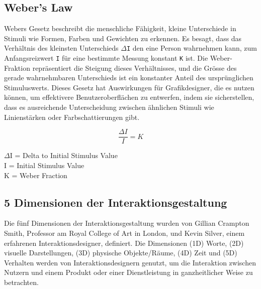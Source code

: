 \documentclass{article}
\begin{document}
\subsection{Weber's Law}
Webers Gesetz beschreibt die menschliche Fähigkeit,
kleine Unterschiede in Stimuli wie Formen, 
Farben und Gewichten zu erkennen. Es besagt, 
dass das Verhältnis des kleinsten Unterschieds \texttt{$\Delta$I}
den eine Person wahrnehmen kann, zum Anfangsreizwert \texttt{I} für eine bestimmte Messung konstant \texttt{K} ist. 
Die Weber-Fraktion repräsentiert die Steigung dieses Verhältnisses,
 und die Grösse des gerade wahrnehmbaren Unterschieds ist ein konstanter 
 Anteil des ursprünglichen Stimuluswerts. Dieses Gesetz hat Auswirkungen für Grafikdesigner,
  die es nutzen können, um effektivere Benutzeroberflächen zu entwerfen, 
  indem sie sicherstellen, dass es ausreichende Unterscheidung zwischen ähnlichen Stimuli
   wie Linienstärken oder Farbschattierungen gibt.\cite{noauthor_virtual_nodate}

\begin{equation}
    \frac{\Delta I}{I} = K
\end{equation}

\begin{center}
    $\Delta$I = Delta to Initial Stimulus Value\\
    I = Initial Stimulus Value\\
    K = Weber Fraction\\
\end{center}
\noindent


\newpage

\subsection{5 Dimensionen der Interaktionsgestaltung}
Die fünf Dimensionen der Interaktionsgestaltung wurden von Gillian Crampton Smith, 
Professor am Royal College of Art in London, und Kevin Silver, einem erfahrenen Interaktionsdesigner,
definiert. Die Dimensionen (1D) Worte, (2D) visuelle Darstellungen, 
(3D) physische Objekte/Räume, (4D) Zeit und (5D) Verhalten werden von Interaktionsdesignern genutzt, 
um die Interaktion zwischen Nutzern und einem Produkt oder einer Dienstleistung in ganzheitlicher 
Weise zu betrachten.\cite{noauthor_what_nodate-1}
\end{document}
